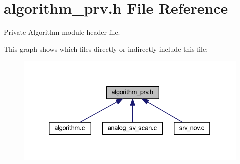 \hypertarget{a00016}{\section{algorithm\+\_\+prv.\+h File Reference}
\label{a00016}
}


Private Algorithm module header file.  


This graph shows which files directly or indirectly include this file\+:\nopagebreak
\begin{figure}[H]
\begin{center}
\leavevmode
\includegraphics[width=332pt]{d0/de2/a00892}
\end{center}
\end{figure}
